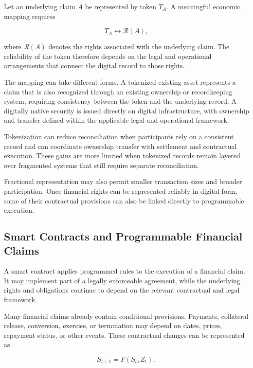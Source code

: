 Let an underlying claim \(A\) be represented by token \(T_A\). A meaningful economic mapping requires

\begin{equation}
T_A \longleftrightarrow \mathcal{R}(A),
\label{eq:ch24-token-mapping}
\end{equation}

where \(\mathcal{R}(A)\) denotes the rights associated with the underlying claim. The reliability of the token therefore depends on the legal and operational arrangements that connect the digital record to those rights.

The mapping can take different forms. A tokenized existing asset represents a claim that is also recognized through an existing ownership or recordkeeping system, requiring consistency between the token and the underlying record. A digitally native security is issued directly on digital infrastructure, with ownership and transfer defined within the applicable legal and operational framework.

Tokenization can reduce reconciliation when participants rely on a consistent record and can coordinate ownership transfer with settlement and contractual execution. These gains are more limited when tokenized records remain layered over fragmented systems that still require separate reconciliation.

Fractional representation may also permit smaller transaction sizes and broader participation. 
Once financial rights can be represented reliably in digital form, some of their contractual provisions can also be linked directly to programmable execution.


\subsection{Smart Contracts and Programmable Financial Claims}

A smart contract applies programmed rules to the execution of a financial claim. It may implement part of a legally enforceable agreement, while the underlying rights and obligations continue to depend on the relevant contractual and legal framework.

Many financial claims already contain conditional provisions. Payments, collateral release, conversion, exercise, or termination may depend on dates, prices, repayment status, or other events. These contractual changes can be represented as

\begin{equation}
S_{t+1}=F(S_t,Z_t),
\label{eq:ch24-smart-contract-state}
\end{equation}

